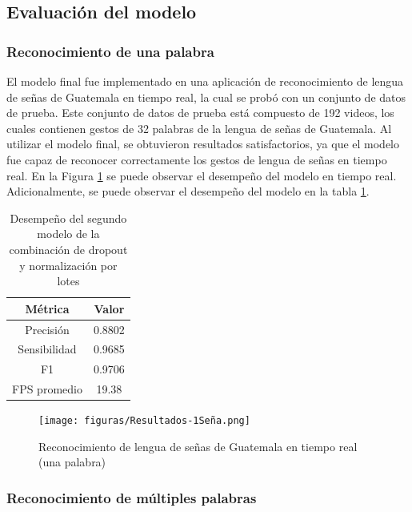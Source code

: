 \subsection{Evaluación del modelo}

\subsubsection{Reconocimiento de una palabra}

El modelo final fue implementado en una aplicación de reconocimiento de lengua de señas de Guatemala en tiempo real, la cual se probó con un conjunto de datos de prueba.
Este conjunto de datos de prueba está compuesto de 192 videos, los cuales contienen gestos de 32 palabras de la lengua de señas de Guatemala.
Al utilizar el modelo final, se obtuvieron resultados satisfactorios, ya que el modelo fue capaz de reconocer correctamente los gestos de lengua de señas en tiempo real.
En la Figura \ref{fig:RealTimeRecognitionUnica} se puede observar el desempeño del modelo en tiempo real.
Adicionalmente, se puede observar el desempeño del modelo en la tabla \ref{tab:DesempeñoModeloFinal}.

\begin{table}[H]
    \centering
    \begin{tabular}{|c|c|}
        \hline
        \textbf{Métrica} & \textbf{Valor} \\
        \hline
        Precisión & 0.8802 \\
        \hline
        Sensibilidad & 0.9685 \\
        \hline
        F1 & 0.9706 \\
        \hline
        FPS promedio & 19.38 \\
        \hline
    \end{tabular}
    \caption{Desempeño del segundo modelo de la combinación de dropout y normalización por lotes}
    \label{tab:DesempeñoModeloFinal}
\end{table}

\begin{figure}[H]
    \centering
    \texttt{[image: figuras/Resultados-1Seña.png]}
    \caption{Reconocimiento de lengua de señas de Guatemala en tiempo real (una palabra)}
    \label{fig:RealTimeRecognitionUnica}
\end{figure}

\subsubsection{Reconocimiento de múltiples palabras}

